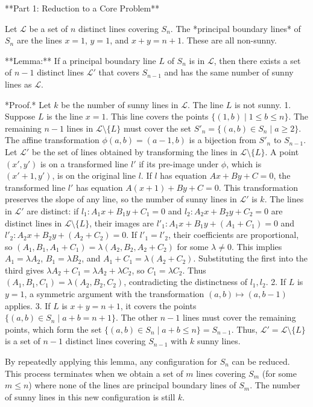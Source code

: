 \documentclass[12pt]{article}
\begin{document}
**Part 1: Reduction to a Core Problem**

Let $\mathcal{L}$ be a set of $n$ distinct lines covering $S_n$. The *principal boundary lines* of $S_n$ are the lines $x=1$, $y=1$, and $x+y=n+1$. These are all non-sunny.

**Lemma:** If a principal boundary line $L$ of $S_n$ is in $\mathcal{L}$, then there exists a set of $n-1$ distinct lines $\mathcal{L}'$ that covers $S_{n-1}$ and has the same number of sunny lines as $\mathcal{L}$.

*Proof.* Let $k$ be the number of sunny lines in $\mathcal{L}$. The line $L$ is not sunny.
1.  Suppose $L$ is the line $x=1$. This line covers the points $\{(1,b) \mid 1 \le b \le n\}$. The remaining $n-1$ lines in $\mathcal{L} \setminus \{L\}$ must cover the set $S'_n = \{(a,b) \in S_n \mid a \ge 2\}$. The affine transformation $\phi(a,b) = (a-1, b)$ is a bijection from $S'_n$ to $S_{n-1}$. Let $\mathcal{L}'$ be the set of lines obtained by transforming the lines in $\mathcal{L} \setminus \{L\}$. A point $(x',y')$ is on a transformed line $l'$ if its pre-image under $\phi$, which is $(x'+1, y')$, is on the original line $l$. If $l$ has equation $Ax+By+C=0$, the transformed line $l'$ has equation $A(x+1)+By+C=0$. This transformation preserves the slope of any line, so the number of sunny lines in $\mathcal{L}'$ is $k$. The lines in $\mathcal{L}'$ are distinct: if $l_1: A_1x+B_1y+C_1=0$ and $l_2: A_2x+B_2y+C_2=0$ are distinct lines in $\mathcal{L} \setminus \{L\}$, their images are $l'_1: A_1x+B_1y+(A_1+C_1)=0$ and $l'_2: A_2x+B_2y+(A_2+C_2)=0$. If $l'_1=l'_2$, their coefficients are proportional, so $(A_1, B_1, A_1+C_1) = \lambda(A_2, B_2, A_2+C_2)$ for some $\lambda \ne 0$. This implies $A_1=\lambda A_2$, $B_1=\lambda B_2$, and $A_1+C_1=\lambda(A_2+C_2)$. Substituting the first into the third gives $\lambda A_2+C_1=\lambda A_2+\lambda C_2$, so $C_1=\lambda C_2$. Thus $(A_1,B_1,C_1)=\lambda(A_2,B_2,C_2)$, contradicting the distinctness of $l_1, l_2$.
2.  If $L$ is $y=1$, a symmetric argument with the transformation $(a,b) \mapsto (a, b-1)$ applies.
3.  If $L$ is $x+y=n+1$, it covers the points $\{(a,b) \in S_n \mid a+b=n+1\}$. The other $n-1$ lines must cover the remaining points, which form the set $\{(a,b) \in S_n \mid a+b \le n\} = S_{n-1}$. Thus, $\mathcal{L}' = \mathcal{L} \setminus \{L\}$ is a set of $n-1$ distinct lines covering $S_{n-1}$ with $k$ sunny lines.

By repeatedly applying this lemma, any configuration for $S_n$ can be reduced. This process terminates when we obtain a set of $m$ lines covering $S_m$ (for some $m \le n$) where none of the lines are principal boundary lines of $S_m$. The number of sunny lines in this new configuration is still $k$.
\end{document}
